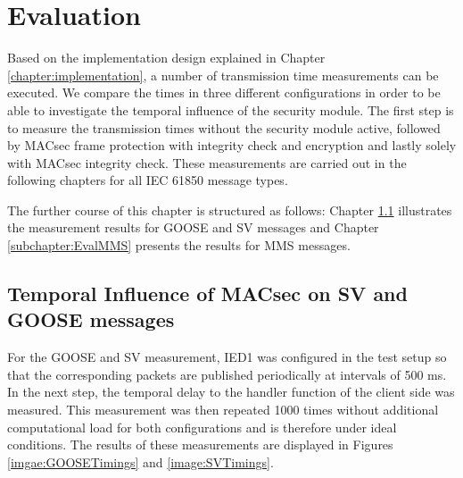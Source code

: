 \documentclass[conference, onecolumn, a4paper]{IEEEtran}
\begin{document}
\section{Evaluation}
\label{chapter:evaluation}
\noindent Based on the implementation design explained in Chapter \ref{chapter:implementation}, a number of transmission time measurements can be 
executed. We compare the times in three different configurations in order to be able to investigate the temporal influence of the security module. 
The first step is to measure the transmission times without the security module active, followed by MACsec frame protection with integrity check and 
encryption and lastly solely with MACsec integrity check. These measurements are carried out in the following chapters for all IEC 61850 message types.

\smallskip
The further course of this chapter is structured as follows: Chapter \ref{subchapter:EvalGOOSESV} illustrates the measurement results for GOOSE and SV messages
and Chapter \ref{subchapter:EvalMMS} presents the results for MMS messages.

\subsection{Temporal Influence of MACsec on SV and GOOSE messages}
\label{subchapter:EvalGOOSESV}
\noindent For the GOOSE and SV measurement, IED1 was configured in the test setup so that the corresponding packets are published periodically at 
intervals of 500 ms. In the next step, the temporal delay to the handler function of the client side was measured. This measurement was then repeated 
1000 times without additional computational load for both configurations and is therefore under ideal conditions. The results of these measurements are 
displayed in Figures \ref{imgae:GOOSETimings} and \ref{image:SVTimings}.
\end{document}
